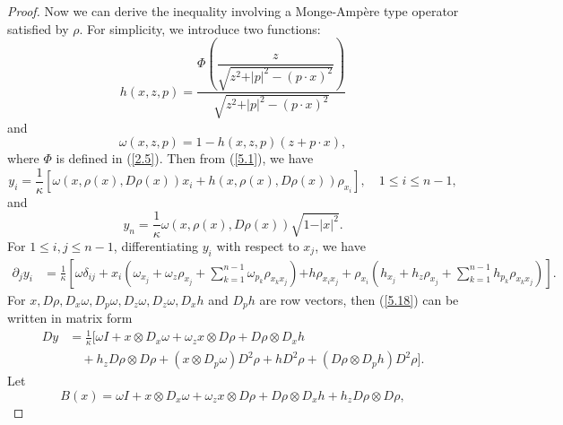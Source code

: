 \documentclass[10pt,a4paper]{amsart}
\begin{document}
\begin{proof}
  Now we can derive the inequality involving a Monge-Amp\`ere type operator satisfied by $\rho$. For simplicity, we introduce two functions:
  \begin{equation}\label{5.14}
    h(x,z,p) = \frac{\Phi\left(\dfrac{z}{\sqrt{z^{2}+\vert p \vert^{2}-(p \cdot x)^{2}}}\right)}{\sqrt{z^{2}+\vert p \vert^{2}-(p \cdot x)^{2}}}
  \end{equation}
  and
  \begin{equation}\label{5.15}
   \omega(x,z,p) = 1 - h(x,z,p)(z + p \cdot x),
  \end{equation}
  where $\Phi$ is defined in (\ref{2.5}). Then from (\ref{5.1}), we have
  \begin{equation}\label{5.16}
    y_{i} = \frac{1}{\kappa}\left[\omega(x,\rho(x),D\rho(x))x_{i} + h(x,\rho(x),D\rho(x))\rho_{x_{i}}\right], \quad 1 \leq i \leq n-1,
  \end{equation}
  and
  \begin{equation}\label{5.17}
    y_{n} = \frac{1}{\kappa} \omega(x,\rho(x),D\rho(x)) \sqrt{1 - \vert x \vert^{2}}.
  \end{equation}
  For $1 \leq i,j \leq n-1$, differentiating $y_{i}$ with respect to $x_{j}$, we have
  \begin{equation}\label{5.18}
    \begin{aligned}
    \partial_{j}y_{i} & = \frac{1}{\kappa}\left[\omega \delta_{ij} + x_{i}(\omega_{x_{j}} + \omega_{z} \rho_{x_{j}} + \sum_{k = 1}^{n-1}\omega_{p_{k}} \rho_{x_{k}x_{j}})\right.  
      \left. + h \rho_{x_{i}x_{j}} + \rho_{x_{i}}(h_{x_{j}} + h_{z} \rho_{x_{j}} + \sum_{k=1}^{n-1} h_{p_{k}} \rho_{x_{k}x_{j}})\right].
    \end{aligned}
  \end{equation}
  For $x, D\rho, D_{x}\omega, D_{p}\omega, D_{z}\omega, D_{z}\omega, D_{x}h$ and $D_{p}h$ are row vectors, then (\ref{5.18}) can be written in matrix form
  \begin{equation}\label{5.19}
    \begin{aligned}
    Dy & = \frac{1}{\kappa}[\omega I + x \otimes D_{x}\omega + \omega_{z}x \otimes D\rho + D\rho \otimes D_{x}h  \\
    & \quad + h_{z}D\rho \otimes D\rho + (x \otimes D_{p}\omega)D^{2}\rho + hD^{2}\rho + (D\rho \otimes D_{p}h)D^{2}\rho].
    \end{aligned}
  \end{equation}
  Let
  \begin{equation}\label{5.20}
    B(x) = \omega I + x \otimes D_{x}\omega + \omega_{z}x \otimes D\rho + D\rho \otimes D_{x}h + h_{z}D\rho \otimes D\rho,

\end{equation}
\end{proof}
\end{document}
